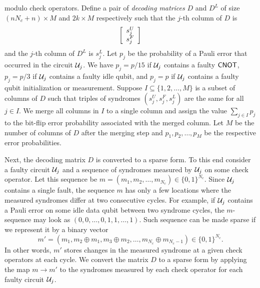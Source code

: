\documentclass{article}
\begin{document}
modulo check operators. Define a  pair of {\em decoding matrices} $D$ and $D^L$
of size $(nN_c+n) \times M$ and $2k\times M$ respectively
such that the $j$-th column of $D$ is
\[
\left[
\ba{c}
s^U_j  \\ 
s^F_j \\
\ea
\right]
\]
and the $j$-th column of $D^L$ is $s^L_j$.
Let $p_j$ be the probability of a Pauli error that occurred  in the circuit $\calU_j$.
We have $p_j=p/15$ if $\calU_j$ contains a faulty $\cnotgate$, 
$p_j=p/3$ if $\calU_j$ contains a faulty idle qubit,
and $p_j=p$ if $\calU_j$ contains a faulty qubit initialization or measurement.
Suppose $I \subseteq \{1,2,\ldots,M\}$ is a subset of columns of 
$D$ such that  triples of syndromes  $(s^U_j,s^F_j,s^L_j)$ are the same for all
$j\in I$. We merge all columns in $I$ to a single column 
 and assign the value
  $\sum_{j\in I} p_j$ 
to the bit-flip error probability associated with the merged column.
Let $M$ be the number of columns of $D$ after the merging step
and $p_1,p_2,\ldots,p_M$ be the respective error probabilities.

Next,  the decoding matrix $D$ is converted  to a sparse form.
To this end consider a faulty circuit $\calU_j$ and a sequence of syndromes
measured by $\calU_j$ on some check operator. Let this sequence be
$m=(m_1,m_2,\ldots,m_{N_c})\in \{0,1\}^{N_c}$. Since $\calU_j$ contains a single fault, 
the sequence $m$ has only a few locations where the measured
syndromes differ at two consecutive cycles.
For example, if $\calU_j$ contains a Pauli error on some idle data qubit between two syndrome cycles,
the $m$-sequence may look as $(0,0,\ldots,0,1,1,\ldots,1)$.
Such sequence can be made sparse if we represent it by a binary vector
\[
m'=(m_1,m_2\oplus m_1,m_3\oplus m_2,\ldots, m_{N_c}\oplus m_{N_c-1}) \in \{0,1\}^{N_c}.
\]
In other words, $m'$ stores changes in the measured syndrome at a given check operators
at each cycle. We convert the matrix $D$ to a sparse form by applying the map $m\to m'$ to the syndromes measured by each check operator for each faulty circuit $\calU_j$.
\end{document}
